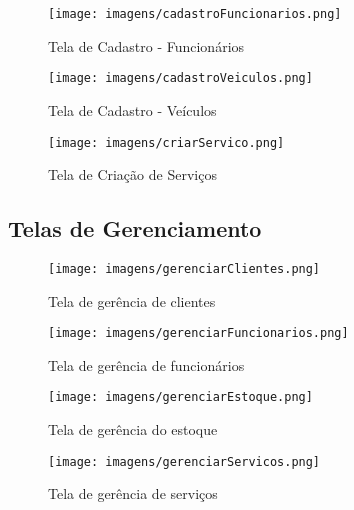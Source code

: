 \documentclass[a4paper,12pt]{article}
\begin{document}
\begin{figure}[H]
    \centering
    \texttt{[image: imagens/cadastroFuncionarios.png]}
    \caption{Tela de Cadastro - Funcionários}
\end{figure}

\begin{figure}[H]
    \centering
    \texttt{[image: imagens/cadastroVeiculos.png]}
    \caption{Tela de Cadastro - Veículos}
\end{figure}

\begin{figure}[H]
    \centering
    \texttt{[image: imagens/criarServico.png]}
    \caption{Tela de Criação de Serviços}
\end{figure}


\subsection{Telas de Gerenciamento}

\begin{figure}[H]
    \centering
    \texttt{[image: imagens/gerenciarClientes.png]}
    \caption{Tela de gerência de clientes}
\end{figure}

\begin{figure}[H]
    \centering
    \texttt{[image: imagens/gerenciarFuncionarios.png]}
    \caption{Tela de gerência de funcionários}
\end{figure}

\begin{figure}[H]
    \centering
    \texttt{[image: imagens/gerenciarEstoque.png]}
    \caption{Tela de gerência do estoque}
\end{figure}

\begin{figure}[H]
    \centering
    \texttt{[image: imagens/gerenciarServicos.png]}
    \caption{Tela de gerência de serviços}
\end{figure}
\end{document}

